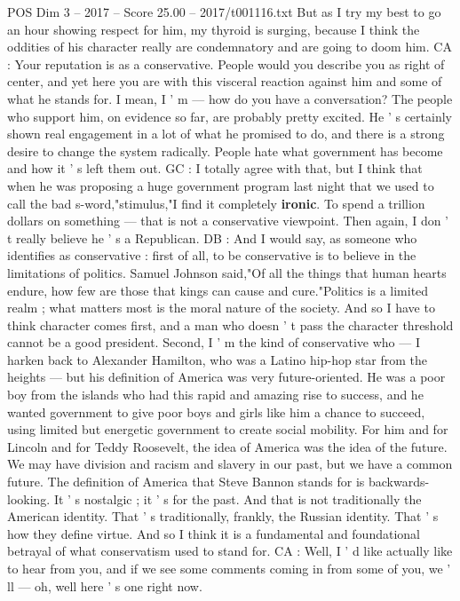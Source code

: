 \begin{textsample}{POS Dim 3 – 2017 – Score 25.00 – 2017/t001116.txt}
But as I try my best to go an hour showing respect for him, my thyroid is surging, because I think the oddities of his character really are condemnatory and are going to doom him.
CA : Your reputation is as a conservative.
People would you describe you as right of center, and yet here you are with this visceral reaction against him and some of what he stands for.
I mean, I ' m — how do you have a conversation?
The people who support him, on evidence so far, are probably pretty excited.
He ' s certainly shown real engagement in a lot of what he promised to do, and there is a strong desire to change the system radically.
People hate what government has become and how it ' s left them out.
GC : I totally agree with that, but I think that when he was proposing a huge government program last night that we used to call the bad s-word,"stimulus,"I find it completely \textbf{ironic}.
To spend a trillion dollars on something — that is not a conservative viewpoint.
Then again, I don ' t really believe he ' s a Republican.
DB : And I would say, as someone who identifies as conservative : first of all, to be conservative is to believe in the limitations of politics.
Samuel Johnson said,"Of all the things that human hearts endure, how few are those that kings can cause and cure."Politics is a limited realm ; what matters most is the moral nature of the society.
And so I have to think character comes first, and a man who doesn ' t pass the character threshold cannot be a good president.
Second, I ' m the kind of conservative who — I harken back to Alexander Hamilton, who was a Latino hip-hop star from the heights — but his definition of America was very future-oriented.
He was a poor boy from the islands who had this rapid and amazing rise to success, and he wanted government to give poor boys and girls like him a chance to succeed, using limited but energetic government to create social mobility.
For him and for Lincoln and for Teddy Roosevelt, the idea of America was the idea of the future.
We may have division and racism and slavery in our past, but we have a common future.
The definition of America that Steve Bannon stands for is backwards-looking.
It ' s nostalgic ; it ' s for the past.
And that is not traditionally the American identity.
That ' s traditionally, frankly, the Russian identity.
That ' s how they define virtue.
And so I think it is a fundamental and foundational betrayal of what conservatism used to stand for.
CA : Well, I ' d like actually like to hear from you, and if we see some comments coming in from some of you, we ' ll — oh, well here ' s one right now.

\end{textsample}
